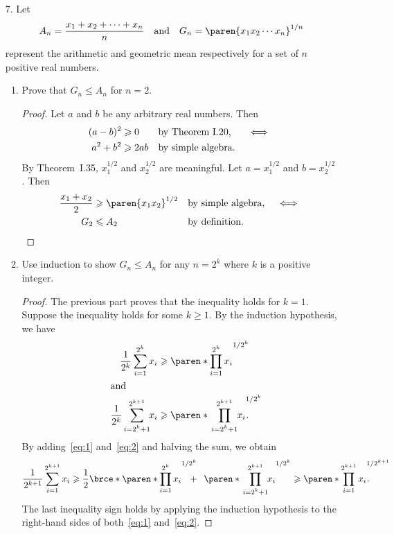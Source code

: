 \documentclass[a4paper]{article}
\begin{document}
\begin{enumerate}
\item[7.\footnotemark]  Let
  \[
    A_n = \frac{x_1 + x_2 + \dotsb + x_n}{n} \quad \text{and} \quad
    G_n = \paren{x_1 x_2 \dotsm x_n}^{1/n}
  \]
  represent the arithmetic and geometric mean respectively for a set
  of \(n\) positive real numbers.
  \begin{enumerate}
  \item Prove that \(G_n \le A_n\) for \(n = 2\).

    \begin{proof}
      Let \(a\) and \(b\) be any arbitrary real numbers.  Then
      \begin{align*}
        (a - b)^2 &\ge 0   && \reason{by Theorem~I.20, }  && \iff \\
        a^2 + b^2 &\ge 2ab && \reason{by simple algebra.}
      \end{align*}
      By Theorem~I.35, \(x_1^{1/2}\) and \(x_2^{1/2}\) are meaningful.
      Let \(a = x_1^{1/2}\) and \(b = x_2^{1/2}\).  Then
      \begin{align*}
        \frac{x_1 + x_2}{2} &\ge \paren{x_1 x_2}^{1/2} && \reason{by simple algebra,} && \iff \\
        G_2 &\le A_2                                   && \reason{by definition.}     && \qedhere
      \end{align*}
    \end{proof}

  \item Use induction to show \(G_n \le A_n\) for any \(n = 2^k\)
    where \(k\) is a positive integer.

    \begin{proof}
      The previous part proves that the inequality holds for
      \(k = 1\).  Suppose the inequality holds for some \(k \ge 1\).
      By the induction hypothesis, we have
      \begin{align}
        \label{eq:1}
        \frac{1}{2^k} \sum_{i=1}^{2^k} x_i
          &\ge \paren*{\prod_{i=1}^{2^k} x_i}^{1/2^k} \\
        \intertext{and}
        \label{eq:2}
        \frac{1}{2^k} \mspace{9mu} \sum_{\mathclap{i=2^k+1}}^{2^{k+1}} \mspace{4mu} x_i
          &\ge \paren*{\mspace{12mu} \prod_{\mathclap{i=2^k+1}}^{2^{k+1}} \mspace{5mu} x_i}^{\mathrlap{1/2^k}}.
      \end{align}
      By adding~\eqref{eq:1} and~\eqref{eq:2} and halving the sum, we obtain
      \begin{displaymath}
        \frac{1}{2^{k+1}} \sum_{i=1}^{2^{k+1}} x_i
        \ge \frac12 \brce*{\paren*{\prod_{i=1}^{2^k} x_i}^{\mathrlap{1/2^k}} \mspace{12mu} + \mspace{9mu} \paren*{\mspace{12mu} \prod_{\mathclap{i=2^k+1}}^{2^{k+1}} \mspace{5mu} x_i}^{1/2^k}}
        \ge \paren*{\prod_{i=1}^{2^{k+1}} x_i}^{\mathrlap{1/2^{k+1}}}.
      \end{displaymath}
      The last inequality sign holds by applying the induction hypothesis to
      the right-hand sides of both~\eqref{eq:1} and~\eqref{eq:2}.
    \end{proof}
    

\end{enumerate}
\end{enumerate}
\end{document}
